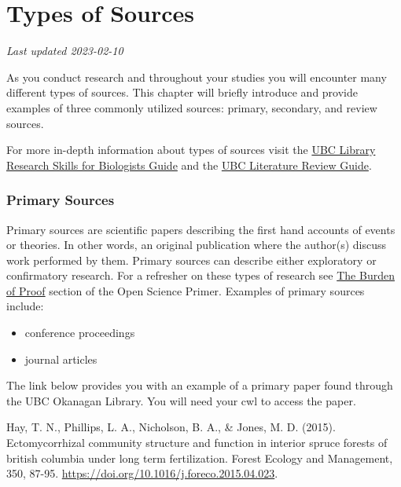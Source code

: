 \documentclass[
]{book}
\providecommand{\tightlist}{%
  \setlength{\itemsep}{0pt}\setlength{\parskip}{0pt}}
\begin{document}
\hypertarget{types-of-sources}{%
\chapter{Types of Sources}\label{types-of-sources}}

\emph{Last updated 2023-02-10}

As you conduct research and throughout your studies you will encounter many different types of sources. This chapter will briefly introduce and provide examples of three commonly utilized sources: primary, secondary, and review sources.

For more in-depth information about types of sources visit the \href{https://guides.library.ubc.ca/c.php?g=704417\&p=5011059}{UBC Library Research Skills for Biologists Guide} and the \href{https://guides.library.ubc.ca/litreviews}{UBC Literature Review Guide}.

\hypertarget{primary-sources}{%
\subsection*{Primary Sources}\label{primary-sources}}

Primary sources are scientific papers describing the first hand accounts of events or theories. In other words, an original publication where the author(s) discuss work performed by them. Primary sources can describe either exploratory or confirmatory research. For a refresher on these types of research see \href{https://ubco-biology.github.io/OS-Introduction/the-burden-of-proof.html}{The Burden of Proof} section of the Open Science Primer. Examples of primary sources include:

\begin{itemize}
\tightlist
\item
  conference proceedings
\item
  journal articles
\end{itemize}

The link below provides you with an example of a primary paper found through the UBC Okanagan Library. You will need your cwl to access the paper.

Hay, T. N., Phillips, L. A., Nicholson, B. A., \& Jones, M. D. (2015). Ectomycorrhizal community structure and function in interior spruce forests of british columbia under long term fertilization. Forest Ecology and Management, 350, 87-95. \url{https://doi.org/10.1016/j.foreco.2015.04.023}.
\end{document}
